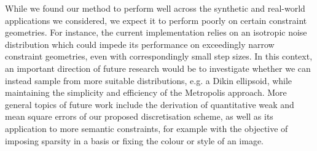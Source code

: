 While we found our method to perform well across the synthetic and real-world applications we considered, we expect it to perform poorly on certain constraint geometries.
For instance, the current implementation relies on an isotropic noise distribution which could impede its performance on exceedingly narrow constraint geometries, even with correspondingly small step sizes.
In this context, an important direction of future research would be to investigate whether we can instead sample from more suitable distributions, e.g. a Dikin ellipsoid, while maintaining the simplicity and efficiency of the Metropolis approach.
More general topics of future work include the derivation of quantitative weak and mean square errors of our proposed discretisation scheme, as well as its application to more semantic constraints, for example with the objective of imposing sparsity in a basis or fixing the colour or style of an image.
